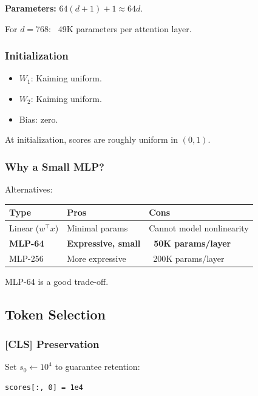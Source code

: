 {\begin{itemize}
\end{itemize}
\textbf{Parameters:} $64 (d + 1) + 1 \approx 64 d$.

For $d = 768$: ~49K parameters per attention layer.

\subsubsection{Initialization}

\begin{itemize}
\item $W_1$: Kaiming uniform.
\item $W_2$: Kaiming uniform.
\item Bias: zero.

\end{itemize}
At initialization, scores are roughly uniform in $(0, 1)$.

\subsubsection{Why a Small MLP?}

Alternatives:

\begin{table}[H]
\centering
\small
\begin{tabular}{lll}
\toprule
\textbf{Type} & \textbf{Pros} & \textbf{Cons} \\
\midrule
Linear ($w^\top x$) & Minimal params & Cannot model nonlinearity \\
\textbf{MLP-64} & \textbf{Expressive, small} & \textbf{~50K params/layer} \\
MLP-256 & More expressive & ~200K params/layer \\
\bottomrule
\end{tabular}
\end{table}

MLP-64 is a good trade-off.

\subsection{Token Selection}

\subsubsection{[CLS] Preservation}

Set $s_0 \leftarrow 10^4$ to guarantee retention:

\begin{lstlisting}
scores[:, 0] = 1e4
\end{lstlisting}

}
